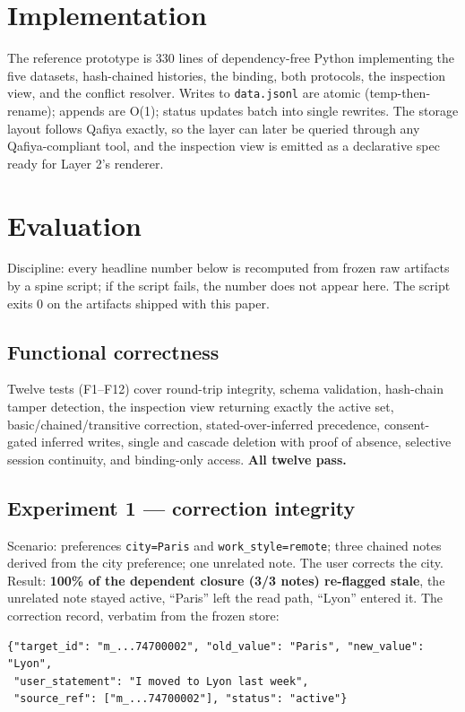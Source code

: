 \documentclass[11pt]{article}
\begin{document}
\section{Implementation}
The reference prototype is 330 lines of dependency-free Python implementing the five datasets, hash-chained histories, the binding, both protocols, the inspection view, and the conflict resolver. Writes to \texttt{data.jsonl} are atomic (temp-then-rename); appends are O(1); status updates batch into single rewrites. The storage layout follows Qafiya exactly, so the layer can later be queried through any Qafiya-compliant tool, and the inspection view is emitted as a declarative spec ready for Layer 2's renderer.

\section{Evaluation}
\label{sec:eval}
Discipline: every headline number below is recomputed from frozen raw artifacts by a spine script; if the script fails, the number does not appear here. The script exits 0 on the artifacts shipped with this paper.

\subsection{Functional correctness}
Twelve tests (F1--F12) cover round-trip integrity, schema validation, hash-chain tamper detection, the inspection view returning exactly the active set, basic/chained/transitive correction, stated-over-inferred precedence, consent-gated inferred writes, single and cascade deletion with proof of absence, selective session continuity, and binding-only access. \textbf{All twelve pass.}

\subsection{Experiment 1 --- correction integrity}
Scenario: preferences \texttt{city=Paris} and \texttt{work\_style=remote}; three chained notes derived from the city preference; one unrelated note. The user corrects the city. Result: \textbf{100\% of the dependent closure (3/3 notes) re-flagged stale}, the unrelated note stayed active, ``Paris'' left the read path, ``Lyon'' entered it. The correction record, verbatim from the frozen store:

\begin{lstlisting}
{"target_id": "m_...74700002", "old_value": "Paris", "new_value": "Lyon",
 "user_statement": "I moved to Lyon last week",
 "source_ref": ["m_...74700002"], "status": "active"}
\end{lstlisting}
\end{document}
